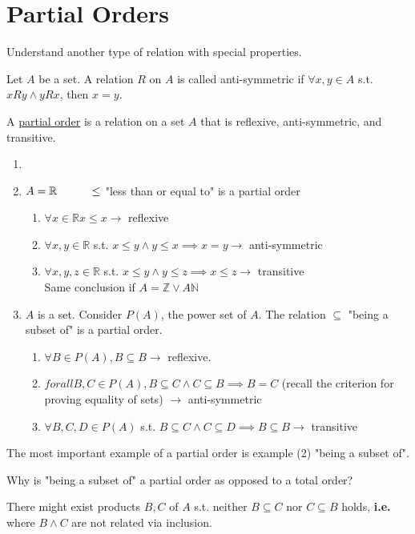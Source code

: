 \documentclass[10pt]{article}
\begin{document}
	\section{Partial Orders}
	\begin{description}
		\item[Task:] Understand another type of relation with special properties.
		\item[Definition:] Let $A$ be a set. A relation $R$ on $A$ is called anti-symmetric if $\forall x, y \in A$ s.t. $xRy \land yRx$, then $x=y$.
		\item[Definition:] A \underline{partial order} is a relation on a set $A$ that is reflexive, anti-symmetric, and transitive.
		\item[Examples:]
		\begin{enumerate}
			\item[]
			\item $A = \mathbb{R} \hspace{10mm} \leq$ "less than or equal to" is a partial order
			\begin{enumerate}
				\item $\forall x \in \mathbb{R} x \leq x \rightarrow$ reflexive
				\item $\forall x, y \in \mathbb{R}$ s.t. $x \leq y \land y \leq x \implies x=y \rightarrow$ anti-symmetric
				\item $\forall x, y, z \in \mathbb{R}$ s.t. $x \leq y \land y \leq z \implies x \leq z \rightarrow$ transitive \\
				Same conclusion if $A = \mathbb{Z} \lor A \mathbb{N}$
			\end{enumerate}
			\item $A$ is a set. Consider $P(A)$, the power set of $A$. The relation $\subseteq$ "being a subset of" is a partial order.
			\begin{enumerate}
				\item $\forall B \in P(A), B\subseteq B \rightarrow$ reflexive.
				\item $forall B, C \in P(A), B \subseteq C \land C \subseteq B \implies B=C$ (recall the criterion for proving equality of sets) $\rightarrow$ anti-symmetric
				\item $\forall B, C, D \in P(A)$ s.t. $B \subseteq C \land C \subseteq D \implies B \subseteq B \rightarrow$ transitive
			\end{enumerate}
		\end{enumerate}
		\item The most important example of a partial order is example (2) "being a subset of".
		\item[Q:] Why is "being a subset of" a partial order as opposed to a total order?
		\item[A:] There might exist products $B, C$ of $A$ s.t. neither $B \subseteq C$ nor $C \subseteq B$ holds, \textbf{i.e.} where $B \land C$ are not related via inclusion.
	\end{description}
	
\end{document}
